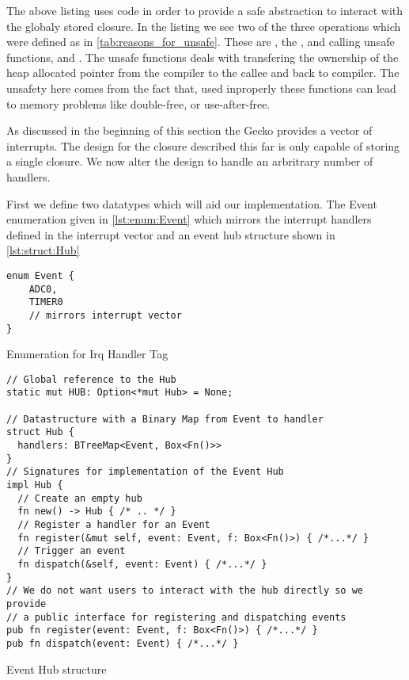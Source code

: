 The above listing uses {\unsafe} code in order to provide a safe abstraction to interact with the globaly stored closure.
In the listing we see two of the three operations which were defined as {\unsafe} in \autoref{tab:reasons_for_unsafe}.
These are , the , and calling unsafe functions,  and .
The unsafe functions deals with transfering the ownership of the heap allocated pointer from the compiler to the callee and back to compiler.
The unsafety here comes from the fact that, used inproperly these functions can lead to memory problems like double-free, or use-after-free.

As discussed in the beginning of this section the Gecko provides a vector of interrupts.
The design for the closure described this far is only capable of storing a single closure.
We now alter the design to handle an arbritrary number of handlers.

First we define two datatypes which will aid our implementation.
The Event enumeration given in \autoref{lst:enum:Event} which mirrors the interrupt handlers defined in the interrupt vector and an event hub structure shown in \autoref{lst:struct:Hub}

\begin{listing}[H]
  \begin{verbatim}
enum Event {
    ADC0,
    TIMER0
    // mirrors interrupt vector
}
  \end{verbatim}
  \caption{Enumeration for Irq Handler Tag}
  \label{lst:enum:Event}
\end{listing}

\begin{listing}[H]
  \begin{verbatim}
// Global reference to the Hub
static mut HUB: Option<*mut Hub> = None;

// Datastructure with a Binary Map from Event to handler
struct Hub {
  handlers: BTreeMap<Event, Box<Fn()>>
}
// Signatures for implementation of the Event Hub
impl Hub {
  // Create an empty hub
  fn new() -> Hub { /* .. */ }
  // Register a handler for an Event
  fn register(&mut self, event: Event, f: Box<Fn()>) { /*...*/ }
  // Trigger an event
  fn dispatch(&self, event: Event) { /*...*/ }
}
// We do not want users to interact with the hub directly so we provide
// a public interface for registering and dispatching events
pub fn register(event: Event, f: Box<Fn()>) { /*...*/ }
pub fn dispatch(event: Event) { /*...*/ }
  \end{verbatim}
  \caption{Event Hub structure}
  \label{lst:struct:Hub}
\end{listing}

